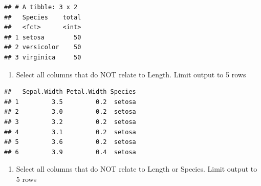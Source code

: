 \documentclass[]{book}
\newenvironment{Shaded}{\begin{snugshade}}{\end{snugshade}}
\newcommand{\CommentTok}[1]{\textcolor[rgb]{0.56,0.35,0.01}{\textit{#1}}}
\newcommand{\DataTypeTok}[1]{\textcolor[rgb]{0.13,0.29,0.53}{#1}}
\newcommand{\KeywordTok}[1]{\textcolor[rgb]{0.13,0.29,0.53}{\textbf{#1}}}
\newcommand{\NormalTok}[1]{#1}
\newcommand{\OperatorTok}[1]{\textcolor[rgb]{0.81,0.36,0.00}{\textbf{#1}}}
\newcommand{\StringTok}[1]{\textcolor[rgb]{0.31,0.60,0.02}{#1}}
\providecommand{\tightlist}{%
  \setlength{\itemsep}{0pt}\setlength{\parskip}{0pt}}
\begin{document}
\begin{Shaded}
\end{Shaded}

\begin{verbatim}
## # A tibble: 3 x 2
##   Species    total
##   <fct>      <int>
## 1 setosa        50
## 2 versicolor    50
## 3 virginica     50
\end{verbatim}

\begin{enumerate}
\def\labelenumi{\arabic{enumi})}
\setcounter{enumi}{4}
\tightlist
\item
  Select all columns that do NOT relate to Length. Limit output to 5 rows
\end{enumerate}

\begin{Shaded}
\end{Shaded}

\begin{verbatim}
##   Sepal.Width Petal.Width Species
## 1         3.5         0.2  setosa
## 2         3.0         0.2  setosa
## 3         3.2         0.2  setosa
## 4         3.1         0.2  setosa
## 5         3.6         0.2  setosa
## 6         3.9         0.4  setosa
\end{verbatim}

\begin{enumerate}
\def\labelenumi{\arabic{enumi})}
\setcounter{enumi}{5}
\tightlist
\item
  Select all columns that do NOT relate to Length or Species. Limit output to 5 rows
\end{enumerate}

\begin{Shaded}
\end{Shaded}
\end{document}

